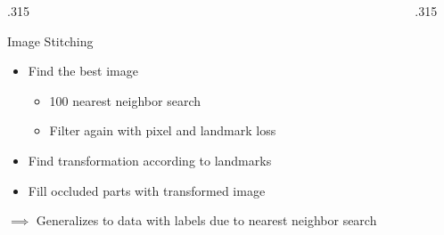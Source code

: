 \documentclass{beamer}
\newcommand{\columnWidth}{.315}
\begin{document}
\begin{frame}[fragile]
\begin{columns}[T]
\begin{column}{\columnWidth\textwidth}
\begin{block}{Image Stitching}
\begin{itemize}
	\item Find the best image
    \begin{itemize}
        \item 100 nearest neighbor search
        \item Filter again with pixel and landmark loss
    \end{itemize}
	\item Find transformation according to landmarks
    \item Fill occluded parts with transformed image
\end{itemize}
$\implies$ Generalizes to data with labels due to nearest neighbor search
\end{block}

\end{column}

\begin{column}{\columnWidth\textwidth}


\end{column}
\end{columns}
\end{frame}
\end{document}
